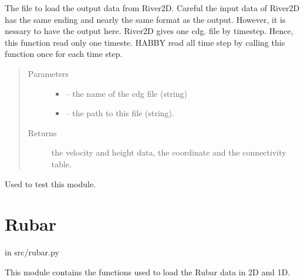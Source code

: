 \documentclass[letterpaper,10pt,english]{sphinxmanual}
\begin{document}

\begin{fulllineitems}
\label{\detokenize{index:src.river2d.load_river2d_cdg}}
The file to load the output data from River2D. Careful the input data of River2D has the same ending and nearly
the same format as the output. However, it is nessary to have the output here. River2D gives one cdg. file by timestep.
Hence, this function read only one timeste. HABBY read all time step by calling this function once for each time step.
\begin{quote}\begin{description}
\item[{Parameters}] \leavevmode\begin{itemize}
\item {} 
 -- the name of the cdg file (string)

\item {} 
 -- the path to this file (string).

\end{itemize}

\item[{Returns}] \leavevmode
the velocity and height data, the coordinate and the connectivity table.

\end{description}\end{quote}

\end{fulllineitems}


\begin{fulllineitems}
\label{\detokenize{index:src.river2d.main}}
Used to test this module.

\end{fulllineitems}



\section{Rubar}
\label{\detokenize{index:rubar}}
in src/rubar.py

This module contains the functions used to load the Rubar data in 2D and 1D.
\label{\detokenize{index:module-src.rubar}}
\end{document}
